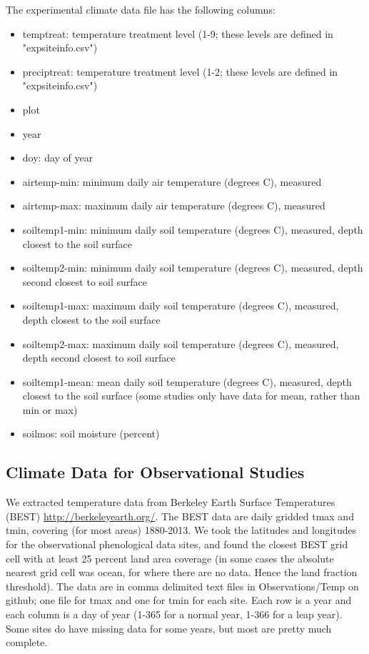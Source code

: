 \documentclass{article}
\begin{document}
The experimental climate data file has the following columns:
\begin{itemize}
  \item temptreat: temperature treatment level (1-9; these levels are defined in "expsiteinfo.csv")
 \item preciptreat: temperature treatment level (1-2; these levels are defined in "expsiteinfo.csv")
 \item plot
 \item year
 \item doy: day of year
 \item airtemp-min: minimum daily air temperature (degrees C), measured
 \item airtemp-max: maximum daily air temperature (degrees C), measured
 \item soiltemp1-min: minimum daily soil temperature (degrees C), measured, depth closest to the soil surface
 \item soiltemp2-min: minimum daily soil temperature (degrees C), measured, depth second closest to soil surface
 \item soiltemp1-max: maximum daily soil temperature (degrees C), measured, depth closest to the soil surface
 \item soiltemp2-max: maximum daily soil temperature (degrees C), measured, depth second closest to soil surface
 \item soiltemp1-mean: mean daily soil temperature (degrees C), measured, depth closest to the soil surface (some studies only have data for mean, rather than min or max)
 \item soilmos: soil moisture (percent)
 
\end{itemize}

\subsection{Climate Data for Observational Studies}

We extracted temperature data from Berkeley Earth Surface Temperatures (BEST) \url{http://berkeleyearth.org/}. The BEST data are daily gridded tmax and tmin, covering (for most areas) 1880-2013. We took the latitudes and longitudes for the observational phenological data sites, and found the closest BEST grid cell with at least 25 percent land area coverage (in some cases the absolute nearest grid cell was ocean, for where there are no data. Hence the land fraction threshold). The data are in comma delimited text files in Observations/Temp on github; one file for tmax and one for tmin for each site. Each row is a year and each column is a day of year (1-365 for a normal year, 1-366 for a leap year). Some sites do have missing data for some years, but most are pretty much complete.
\end{document}
